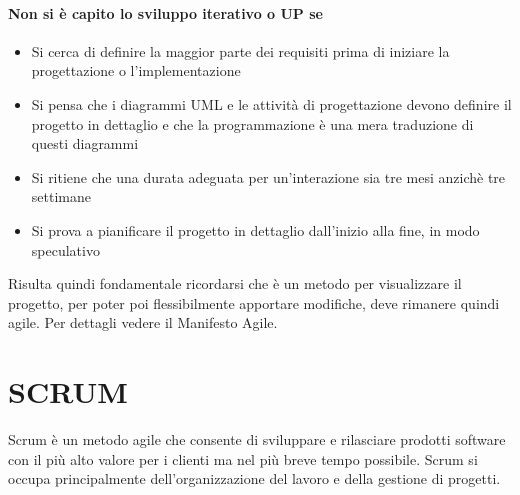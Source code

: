 \paragraph*{Non si è capito lo sviluppo iterativo o UP se}
\begin{itemize}
    \item Si cerca di definire la maggior parte dei requisiti prima di iniziare
    la progettazione o l'implementazione
    \item Si pensa che i diagrammi UML e le attività di progettazione devono
    definire il progetto in dettaglio e che la programmazione è una mera traduzione
    di questi diagrammi
    \item Si ritiene che una durata adeguata per un'interazione sia tre mesi
    anzichè tre settimane
    \item Si prova a pianificare il progetto in dettaglio dall'inizio alla fine,
    in modo speculativo
\end{itemize}
Risulta quindi fondamentale ricordarsi che è un metodo per visualizzare il progetto,
per poter poi flessibilmente apportare modifiche, deve rimanere quindi agile.
Per dettagli vedere il Manifesto Agile.
\section{SCRUM}
Scrum è un metodo agile che consente di sviluppare e rilasciare prodotti software con il più alto valore
per i clienti ma nel più breve tempo possibile.
Scrum si occupa principalmente dell'organizzazione del lavoro e della gestione
di progetti.
